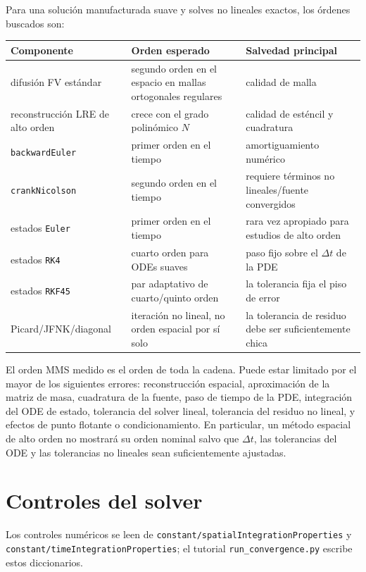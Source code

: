 \documentclass[11pt,a4paper]{article}
\newcommand{\code}[1]{\texttt{\small #1}}
\begin{document}
Para una solución manufacturada suave y solves no lineales exactos, los órdenes buscados son:
\begin{center}
\scriptsize
\begin{tabular}{@{}lll@{}}
Componente & Orden esperado & Salvedad principal \\
\midrule
difusión FV estándar & segundo orden en el espacio en mallas ortogonales regulares & calidad de malla \\
reconstrucción LRE de alto orden & crece con el grado polinómico $N$ & calidad de esténcil y cuadratura \\
\code{backwardEuler} & primer orden en el tiempo & amortiguamiento numérico \\
\code{crankNicolson} & segundo orden en el tiempo & requiere términos no lineales/fuente convergidos \\
estados \code{Euler} & primer orden en el tiempo & rara vez apropiado para estudios de alto orden \\
estados \code{RK4} & cuarto orden para ODEs suaves & paso fijo sobre el $\Delta t$ de la PDE \\
estados \code{RKF45} & par adaptativo de cuarto/quinto orden & la tolerancia fija el piso de error \\
Picard/JFNK/diagonal & iteración no lineal, no orden espacial por sí solo & la tolerancia de residuo debe ser suficientemente chica \\
\bottomrule
\end{tabular}
\end{center}
El orden MMS medido es el orden de toda la cadena. Puede estar limitado por el mayor de los
siguientes errores: reconstrucción espacial, aproximación de la matriz de masa, cuadratura de
la fuente, paso de tiempo de la PDE, integración del ODE de estado, tolerancia del solver
lineal, tolerancia del residuo no lineal, y efectos de punto flotante o condicionamiento. En
particular, un método espacial de alto orden no mostrará su orden nominal salvo que $\Delta t$,
las tolerancias del ODE y las tolerancias no lineales sean suficientemente ajustadas.

\section{Controles del solver}
\label{sec:controles-solver}

Los controles numéricos se leen de \code{constant/spatialIntegrationProperties} y
\code{constant/timeIntegrationProperties}; el tutorial \code{run\_convergence.py} escribe estos
diccionarios.
\end{document}
